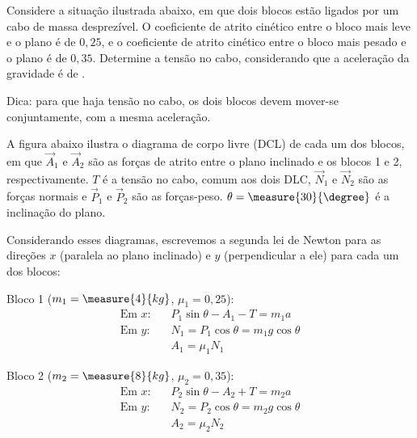 \begin{question}
    Considere a situação ilustrada abaixo, em que dois blocos estão ligados por um cabo de massa desprezível.
    O coeficiente de atrito cinético entre o bloco mais leve e o plano é de $0,25$, e o coeficiente de atrito cinético entre o bloco mais pesado e o plano é de $0,35$.
    Determine a tensão no cabo, considerando que a aceleração da gravidade é de .


    \begin{compactdesc}
      \item[Dica:] para que haja tensão no cabo, os dois blocos devem mover-se conjuntamente, com a mesma aceleração.
    \end{compactdesc}

    \begin{answer}
    \end{answer}

    \begin{solution}
      A figura abaixo ilustra o diagrama de corpo livre (DCL) de cada um dos blocos, em que $\vec A_1$ e $\vec A_2$ são as forças de atrito entre o plano inclinado e os blocos 1 e 2, respectivamente.
      $T$ é a tensão no cabo, comum aos dois DLC, $\vec N_1$ e $\vec N_2$ são as forças normais e $\vec P_1$ e $\vec P_2$ são as forças-peso.
      $\theta = \measure{30}{\degree}$ é a inclinação do plano.


      Considerando esses diagramas, escrevemos a segunda lei de Newton para as direções $x$ (paralela ao plano inclinado) e $y$ (perpendicular a ele) para cada um dos blocos:

      \begin{minipage}[t]{0.45\textwidth}
        Bloco 1 ($m_1 = \measure{4}{kg}$, $\mu_1 = 0,25$):
        \begin{align}
          \text{Em $x$:}&\quad P_1\sin\theta - A_1 - T = m_1a \label{eq:1x}\\
          \text{Em $y$:}&\quad N_1 = P_1\cos\theta = m_1 g \cos\theta \label{eq:1y}\\
                        &\quad A_1 = \mu_1 N_1 \label{eq:A1}
        \end{align}
      \end{minipage}\hfill
      \begin{minipage}[t]{0.45\textwidth}
        Bloco 2 ($m_2 = \measure{8}{kg}$, $\mu_2 = 0,35$):
        \begin{align}
          \text{Em $x$:}&\quad P_2\sin\theta - A_2 + T = m_2a \label{eq:2x}\\
          \text{Em $y$:}&\quad N_2 = P_2\cos\theta = m_2 g \cos\theta \label{eq:1y}\\
                        &\quad A_2 = \mu_2 N_2 \label{eq:A2}
        \end{align}
      \end{minipage}


\end{solution}
\end{question}
